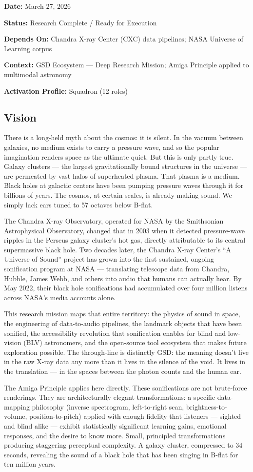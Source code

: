 \documentclass[11pt,letterpaper]{article}
\newcommand{\metafield}[2]{\textbf{\sffamily #1} #2\par}
\begin{document}
\metafield{Date:}{March 27, 2026}
\metafield{Status:}{Research Complete / Ready for Execution}
\metafield{Depends On:}{Chandra X-ray Center (CXC) data pipelines; NASA Universe of Learning corpus}
\metafield{Context:}{GSD Ecosystem — Deep Research Mission; Amiga Principle applied to multimodal astronomy}
\metafield{Activation Profile:}{Squadron (12 roles)}

\subsection{Vision}

There is a long-held myth about the cosmos: it is silent. In the vacuum between galaxies, no medium exists to carry a pressure wave, and so the popular imagination renders space as the ultimate quiet. But this is only partly true. Galaxy clusters — the largest gravitationally bound structures in the universe — are permeated by vast halos of superheated plasma. That plasma is a medium. Black holes at galactic centers have been pumping pressure waves through it for billions of years. The cosmos, at certain scales, is already making sound. We simply lack ears tuned to 57 octaves below B-flat.

The Chandra X-ray Observatory, operated for NASA by the Smithsonian Astrophysical Observatory, changed that in 2003 when it detected pressure-wave ripples in the Perseus galaxy cluster's hot gas, directly attributable to its central supermassive black hole. Two decades later, the Chandra X-ray Center's ``A Universe of Sound'' project has grown into the first sustained, ongoing sonification program at NASA — translating telescope data from Chandra, Hubble, James Webb, and others into audio that humans can actually hear. By May 2022, their black hole sonifications had accumulated over four million listens across NASA's media accounts alone.

This research mission maps that entire territory: the physics of sound in space, the engineering of data-to-audio pipelines, the landmark objects that have been sonified, the accessibility revolution that sonification enables for blind and low-vision (BLV) astronomers, and the open-source tool ecosystem that makes future exploration possible. The through-line is distinctly GSD: the meaning doesn't live in the raw X-ray data any more than it lives in the silence of the void. It lives in the translation — in the spaces between the photon counts and the human ear.

The Amiga Principle applies here directly. These sonifications are not brute-force renderings. They are architecturally elegant transformations: a specific data-mapping philosophy (inverse spectrogram, left-to-right scan, brightness-to-volume, position-to-pitch) applied with enough fidelity that listeners — sighted and blind alike — exhibit statistically significant learning gains, emotional responses, and the desire to know more. Small, principled transformations producing staggering perceptual complexity. A galaxy cluster, compressed to 34 seconds, revealing the sound of a black hole that has been singing in B-flat for ten million years.
\end{document}
